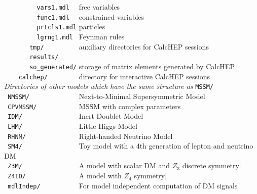 \documentclass[12pt,a4paper]{article}
\begin{document}
\verb|         vars1.mdl  |  free  variables   \\
\verb|         func1.mdl  |  constrained variables   \\
\verb|         prtcls1.mdl|  particles  \\
\verb|         lgrng1.mdl |   Feynman rules\\
\verb|       tmp/         | auxiliary directories for CalcHEP sessions    \\
\verb|       results/  |                                                  \\
\verb|       so_generated/|   storage  of  matrix elements generated by CalcHEP \\
\verb|    calchep/        |   directory for interactive CalcHEP sessions    \\
{\it Directories of other models which have the same structure as} {\tt  MSSM/ }\\
\verb| NMSSM/             |         Next-to-Minimal Supersymmetric Model\cite{Ellwanger:2006rn,Belanger:2005kh} \\
\verb| CPVMSSM/           |         MSSM with complex parameters\cite{Lee:2003nta,  Belanger:2006qa} \\
\verb| IDM/               |         Inert Doublet Model\cite{Barbieri:2006dq}  \\
\verb| LHM/               |         Little Higgs Model\cite{Belyaev:2006jh} \\
\verb| RHNM/              |         Right-handed Neutrino Model\cite{Belanger:2007dx}                  \\
\verb| SM4/               |            Toy model with a 4th generation of lepton and neutrino DM   \\
\verb| Z3M/               |           A model with scalar DM and $Z_3$ discrete
symmetry|\cite{Belanger:2012vp,Belanger:2014bga} \\
\verb| Z4ID/              |           A model with $Z_4$
symmetry|\cite{Belanger:2012vp,Belanger:2014bga} \\  
\verb| mdlIndep/          |           For model independent computation of DM signals                                 \\
\end{document}
